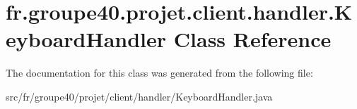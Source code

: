 \hypertarget{classfr_1_1groupe40_1_1projet_1_1client_1_1handler_1_1_keyboard_handler}{}\section{fr.\+groupe40.\+projet.\+client.\+handler.\+Keyboard\+Handler Class Reference}
\label{classfr_1_1groupe40_1_1projet_1_1client_1_1handler_1_1_keyboard_handler}


The documentation for this class was generated from the following file\+:\begin{DoxyCompactItemize}
\item 
src/fr/groupe40/projet/client/handler/Keyboard\+Handler.\+java\end{DoxyCompactItemize}
